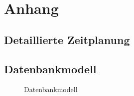 \section{Anhang}
\subsection{Detaillierte Zeitplanung}
\label{app:Zeitplanung}


\clearpage



\subsection{Datenbankmodell}
\label{app:Datenbankmodell}
\begin{figure}[htb]
\centering
{}
\caption{Datenbankmodell}
\end{figure}
\clearpage


\clearpage

\clearpage

